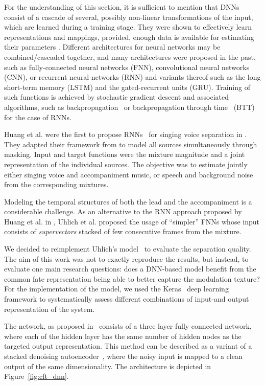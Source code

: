 For the understanding of this section, it is sufficient to mention that DNNs consist of a cascade of several, possibly non-linear transformations of the input, which are learned during a training stage.
They were shown to effectively learn representations and mappings, provided, enough data is available for estimating their parameters \cite{deng14, lecun15, goodfellow16}.
Different architectures for neural networks may be combined/cascaded together, and many architectures were proposed in the past, such as fully-connected neural networks (FNN), convolutional neural networks (CNN), or recurrent neural networks (RNN) and variants thereof such as the long short-term memory (LSTM) and the gated-recurrent units (GRU).
Training of such functions is achieved by stochastic gradient descent \cite{robbins51} and associated algorithms, such as backpropagation~\cite{rumelhart862} or backpropagation through time~\cite{rumelhart86} (BTT) for the case of RNNs.
\par
Huang et al. were the first to propose RNNs~\cite{hermans13,pascanu14} for singing voice separation in \cite{huang14,huang15}. They adapted their framework from \cite{huang142} to model all sources simultaneously through masking. Input and target functions were the mixture magnitude and a joint representation of the individual sources. The objective was to estimate jointly either singing voice and accompaniment music, or speech and background noise from the corresponding mixtures.
\par
Modeling the temporal structures of both the lead and the accompaniment is a considerable challenge. As an alternative to the RNN approach proposed by Huang et al. in \cite{huang14}, Uhlich et al. proposed the usage of ``simpler'' FNNs \cite{uhlich15} whose input consists of \textit{supervectors} stacked of few consecutive frames from the mixture.
\par
We decided to reimplement Uhlich's model~\cite{uhlich15} to evaluate the separation quality.
The aim of this work was not to exactly reproduce the results, but instead, to evaluate one main research questions: does a DNN-based model benefit from the common fate representation being able to better capture the modulation texture?
For the implementation of the model, we used the Keras~\cite{chollet15} deep learning framework to systematically assess different combinations of input-and output representation of the system.

\par
The network, as proposed in~\cite{uhlich15} consists of a three layer fully connected network, where each of the hidden layer has the same number of hidden nodes as the targeted output representation.
This method can be described as a variant of a stacked denoising autoencoder~\cite{pvincent08}, where the noisy input is mapped to a clean output of the same dimensionality.
The architecture is depicted in Figure~\ref{fig:cft_dnn}. 

